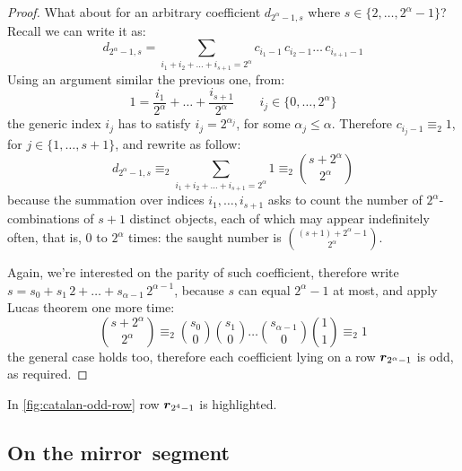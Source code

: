 \begin{proof}
    What about for an arbitrary coefficient $d_{2^{\alpha}-1,s}$ where
    $s\in\lbrace{2,\ldots,2^{\alpha}-1}\rbrace$?  Recall we can write it as:
    \begin{displaymath}
        d_{2^{\alpha}-1,s} = \sum_{i_{1}+i_{2}+\ldots+i_{s+1}=2^{\alpha}}
            {c_{i_{1}-1}\,c_{i_{2}-1}\ldots\,c_{i_{s+1}-1}}
    \end{displaymath}
    Using an argument similar the previous one, from:
    \begin{displaymath}
        1 = \frac{i_{1}}{2^{\alpha}}+\ldots+\frac{i_{s+1}}{2^{\alpha}} \qquad 
            i_{j}\in\lbrace 0,\ldots,2^{\alpha}\rbrace
    \end{displaymath} 
    the generic index $i_{j}$ has to satisfy $i_{j}=2^{\alpha_{j}}$, for some
    $\alpha_{j}\leq\alpha$. Therefore $c_{i_{j}-1}\equiv_{2}1$,
    for $j\in\lbrace1,\ldots,s+1\rbrace$, and rewrite as follow:
    \begin{displaymath}
        d_{2^{\alpha}-1,s} \equiv_{2} \sum_{i_{1}+i_{2}+\ldots+i_{s+1}=2^{\alpha}}{1}
            \equiv_{2} {{s+2^{\alpha}}\choose{2^{\alpha}}}
    \end{displaymath}
    because the summation over indices $i_{1},\ldots,i_{s+1}$ asks to 
    count the number of $2^{\alpha}$-combinations of $s+1$ distinct objects,
    each of which may appear indefinitely often, that is, $0$ to $2^{\alpha}$
    times: the saught number is ${{(s+1)+2^{\alpha}-1}\choose{2^{\alpha}}}$.

    Again, we're interested on the parity of such coefficient, therefore
    write $s=s_{0}+s_{1}\,2+\ldots+s_{\alpha-1}\,2^{\alpha-1}$, because $s$ can equal 
    $2^{\alpha}-1$ at most, and apply Lucas theorem one more time:
    \begin{displaymath}
        {{s+2^{\alpha}}\choose{2^{\alpha}}}\equiv_{2} 
            {{s_{0}}\choose{0}}{{s_{1}}\choose{0}} \ldots
                {{s_{\alpha-1}}\choose{0}}{{1}\choose{1}}\equiv_{2}1 
    \end{displaymath}
    the general case holds too, therefore each coefficient lying on
    a row $\boldsymbol{r}_{2^{\alpha}-1}$ is odd, as required.
\end{proof}


In \autoref{fig:catalan-odd-row} row $\boldsymbol{r}_{2^{4}-1}$ is highlighted.

\subsection{On the \flqq mirror\frqq\, segment}

